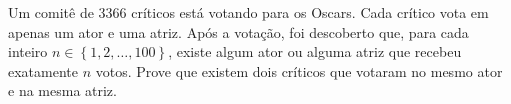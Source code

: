 Um comitê de $3366$ críticos está votando para os Oscars. Cada crítico vota em apenas um ator e uma atriz.
Após a votação, foi descoberto que, para cada inteiro $n \in \left \{1, 2, \ldots, 100 \right \}$, existe algum ator ou alguma atriz que recebeu exatamente $n$ votos. Prove que existem dois críticos que votaram no mesmo ator e na mesma atriz.
